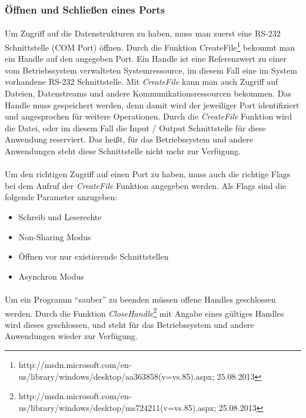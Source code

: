 \subsubsection{Öffnen und Schließen eines Ports}
\paragraph{}
Um Zugriff auf die Datenstrukturen zu haben, muss man zuerst eine RS-232 Schnittstelle (COM Port) öffnen. Durch die Funktion CreateFile\footnote{http://msdn.microsoft.com/en-us/library/windows/desktop/aa363858(v=vs.85).aspx; 25.08.2013} bekommt man ein Handle auf den angegeben Port. Ein Handle ist eine Referenzwert zu einer vom Betriebssystem verwalteten Systemressource, im diesem Fall eine im System vorhandene RS-232 Schnittstelle. Mit \textit{CreateFile} kann man auch Zugriff auf Dateien, Datenstreams und andere Kommunikationsressourcen bekommen. Das Handle muss gespeichert werden, denn damit wird der jeweiliger Port identifiziert und angesprochen für weitere Operationen. Durch die \textit{CreateFile} Funktion wird die Datei, oder im diesem Fall die Input / Output Schnittstelle für diese Anwendung reserviert. Das heißt, für das Betriebssystem und andere Anwendungen steht diese Schnittstelle nicht mehr zur Verfügung.

\paragraph{}
Um den richtigen Zugriff auf einen Port zu haben, muss auch die richtige Flags bei dem Aufruf der \textit{CreateFile} Funktion angegeben werden. Als Flags sind die folgende Parameter anzugeben:
\begin{itemize}
\item Schreib und Leserechte
\item Non-Sharing Modus
\item Öffnen vor nur existierende Schnittstellen
\item Asynchron Modus
\end{itemize}


\paragraph{}
Um ein Programm "`sauber"' zu beenden müssen offene Handles geschlossen werden. Durch die Funktion \textit{CloseHandle}\footnote{http://msdn.microsoft.com/en-us/library/windows/desktop/ms724211(v=vs.85).aspx; 25.08.2013} mit Angabe eines gültiges Handles wird dieses geschlossen, und steht für das Betriebssystem und andere Anwendungen wieder zur Verfügung.


